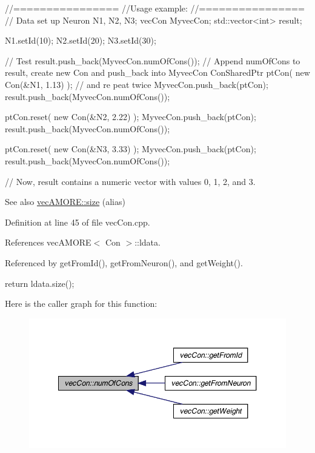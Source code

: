\begin{DoxyCode}
  //================
  //Usage example:
  //================
                        // Data set up
                        Neuron N1, N2, N3;
                        vecCon MyvecCon;
                        std::vector<int> result;

                        N1.setId(10);
                        N2.setId(20);
                        N3.setId(30);

                        // Test
                        result.push_back(MyvecCon.numOfCons());         // Append
       numOfCons to result, create new Con and push_back into MyvecCon
                        ConSharedPtr ptCon( new Con(&N1, 1.13) );       // and re
      peat twice
                        MyvecCon.push_back(ptCon);
                        result.push_back(MyvecCon.numOfCons());

                        ptCon.reset(  new Con(&N2, 2.22) );
                        MyvecCon.push_back(ptCon);
                        result.push_back(MyvecCon.numOfCons());

                        ptCon.reset(  new Con(&N3, 3.33) );
                        MyvecCon.push_back(ptCon);
                        result.push_back(MyvecCon.numOfCons());

        // Now, result contains a numeric vector with values 0, 1, 2, and 3.
\end{DoxyCode}


\begin{DoxySeeAlso}{See also}
\hyperlink{classvec_a_m_o_r_e_ae1289a7870dbdd19b6455a890e94ce48}{vecAMORE::size} (alias) 
\end{DoxySeeAlso}


Definition at line 45 of file vecCon.cpp.



References vecAMORE$<$ Con $>$::ldata.



Referenced by getFromId(), getFromNeuron(), and getWeight().


\begin{DoxyCode}
                       {
        return ldata.size();
}
\end{DoxyCode}


Here is the caller graph for this function:
\nopagebreak
\begin{figure}[H]
\begin{center}
\leavevmode
\includegraphics[width=348pt]{classvec_con_a1e39a5e78c40ae8af9bbd2fd7f0dc749_icgraph}
\end{center}
\end{figure}


